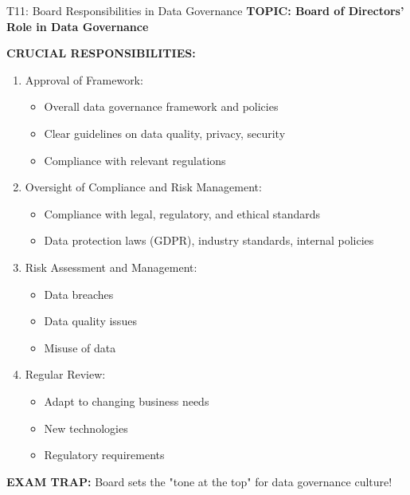 \documentclass[8pt]{beamer}
\begin{document}
	\begin{frame}{T11: Board Responsibilities in Data Governance}
		\fontsize{6.5}{7.5}\selectfont
		\textbf{TOPIC: Board of Directors' Role in Data Governance}
		
		\vspace{0.1cm}
		\textbf{CRUCIAL RESPONSIBILITIES:}
		\begin{enumerate}
			\item \textcolor{myblue}{Approval of Framework:}
			\begin{itemize}
				\item Overall data governance framework and policies
				\item Clear guidelines on data quality, privacy, security
				\item Compliance with relevant regulations
			\end{itemize}
			\item \textcolor{myblue}{Oversight of Compliance and Risk Management:}
			\begin{itemize}
				\item Compliance with legal, regulatory, and ethical standards
				\item Data protection laws (GDPR), industry standards, internal policies
			\end{itemize}
			\item \textcolor{myblue}{Risk Assessment and Management:}
			\begin{itemize}
				\item Data breaches
				\item Data quality issues
				\item Misuse of data
			\end{itemize}
			\item \textcolor{myblue}{Regular Review:}
			\begin{itemize}
				\item Adapt to changing business needs
				\item New technologies
				\item Regulatory requirements
			\end{itemize}
		\end{enumerate}
		
		\textcolor{myred}{\textbf{EXAM TRAP:}} Board sets the \textcolor{myblue}{"tone at the top"} for data governance culture!
	\end{frame}
	
\end{document}
